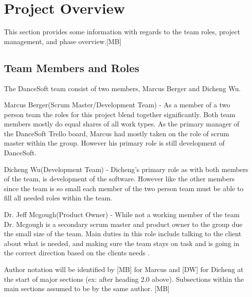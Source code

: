 

\chapter{Project Overview}
This section provides some information with regards to the 
team roles, project management, and phase overview.[MB]

\section{Team Members and Roles}
The DanceSoft team consist of two members, Marcus Berger and Dicheng Wu.

Marcus Berger(Scrum Master/Development Team) -  As a member of a two person team the roles for this project blend together significantly. Both team members mostly do equal shares of all work types. As the primary manager of the DanceSoft Trello board, Marcus had mostly taken on the role of scrum master within the group. However his primary role is still development of DanceSoft.

Dicheng Wu(Development Team) - Dicheng's primary role as with both members of the team, is development of the software. However like the other members since the team is so small each member of the two person team must be able to fill all needed roles within the team.

Dr. Jeff Mcgough(Product Owner) - While not a working member of the team Dr. Mcgough is a secondary scrum master and product owner to the group due the small size of the team. Main duties in this role include talking to the client about what is needed, and making sure the team stays on task and is going in the correct direction based on the clients needs .

Author notation will be identified by [MB] for Marcus and [DW] for Dicheng at the start of
major sections (ex: after heading 2.0 above). Subsections within the main sections assumed to be by the
same author. [MB] 


